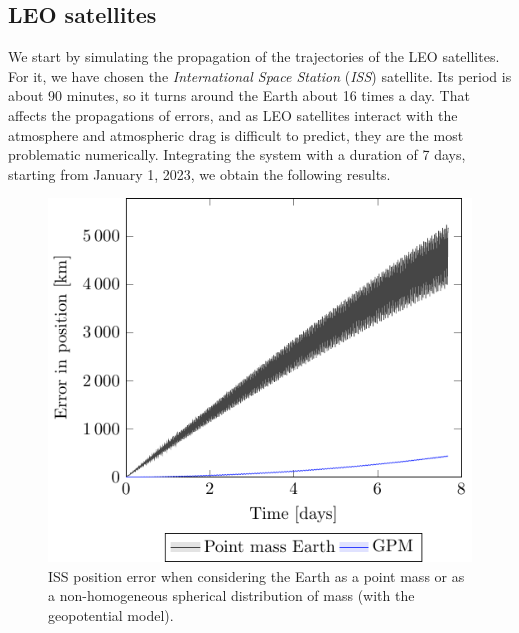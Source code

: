 \documentclass[../main.tex]{subfiles}
\begin{document}
\subsection{LEO satellites}
We start by simulating the propagation of the trajectories of the LEO satellites. For it, we have chosen the \emph{International Space Station} (\emph{ISS}) satellite. Its period is about 90 minutes, so it turns around the Earth about 16 times a day. That affects the propagations of errors, and as LEO satellites interact with the atmosphere and atmospheric drag is difficult to predict, they are the most problematic numerically. Integrating the system with a duration of 7 days, starting from January 1, 2023, we obtain the following results.
\begin{figure}[htbp]
  \centering
  \begin{minipage}[ht]{0.45\textwidth}
    \centering
    \includegraphics[width=\textwidth]{Images/simulation/ISS_pointMass_comparison.pdf}
    \caption{ISS position error when considering the Earth as a point mass or as a non-homogeneous spherical distribution of mass (with the geopotential model).}
    \label{fig:ISS_point}
  \end{minipage}
  \hspace{0.0333333\textwidth}
  \begin{minipage}[ht]{0.45\textwidth}
    \centering

\end{minipage}
\end{figure}
\end{document}
